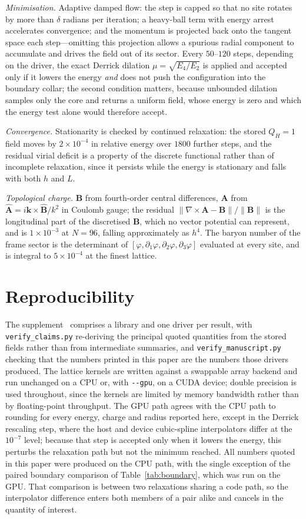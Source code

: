 \documentclass[aps,prd,preprint,nofootinbib,longbibliography]{revtex4-2}
\newcommand{\Av}{\bm{A}}
\newcommand{\Bv}{\bm{B}}
\newcommand{\Qh}{Q_H}
\begin{document}
\emph{Minimisation.} Adaptive damped flow: the step is capped so that no site
rotates by more than $\delta$ radians per iteration; a heavy-ball term with
energy arrest accelerates convergence; and the momentum is projected back onto
the tangent space each step---omitting this projection allows a spurious radial
component to accumulate and drives the field out of its sector. Every $50$--$120$
steps, depending on the driver, the exact Derrick dilation $\mu=\sqrt{E_4/E_2}$ is applied and accepted
only if it lowers the energy \emph{and} does not push the configuration into the
boundary collar; the second condition matters, because unbounded dilation samples
only the core and returns a uniform field, whose energy is zero and which the
energy test alone would therefore accept.

\emph{Convergence.} Stationarity is checked by continued relaxation: the stored
$\Qh=1$ field moves by $2\times10^{-4}$ in relative energy over $1800$ further
steps, and the residual virial deficit is a property of the discrete functional
rather than of incomplete relaxation, since it persists while the energy is
stationary and falls with both $h$ and $L$.

\emph{Topological charge.} $\Bv$ from fourth-order central differences, $\Av$
from $\hat{\Av}=i\bm{k}\times\hat{\Bv}/k^2$ in Coulomb gauge; the residual
$\|\nabla\times\Av-\Bv\|/\|\Bv\|$ is the longitudinal part of the discretised
$\Bv$, which no vector potential can represent, and is $1\times10^{-3}$ at $N=96$,
falling approximately as $h^4$. The baryon number
of the frame sector is the determinant of
$[\varphi,\partial_1\varphi,\partial_2\varphi,\partial_3\varphi]$ evaluated at
every site, and is integral to $5\times10^{-4}$ at the finest lattice.

\section{Reproducibility}

The supplement~\cite{repo} comprises a library and one driver per result, with
\texttt{verify\_claims.py} re-deriving the principal quoted quantities from the
stored fields rather than from intermediate summaries, and
\texttt{verify\_manuscript.py} checking that the numbers printed in this paper
are the numbers those drivers produced.
The lattice kernels are written against a swappable array backend and run unchanged
on a CPU or, with \texttt{-{}-gpu}, on a CUDA device; double precision is used
throughout, since the kernels are limited by memory bandwidth rather than by
floating-point throughput. The GPU path agrees with the CPU path to rounding for
every energy, charge and radius reported here, except in the Derrick rescaling
step, where the host and device cubic-spline interpolators differ at the
$10^{-7}$ level; because that step is accepted only when it lowers the energy,
this perturbs the relaxation path but not the minimum reached. All numbers quoted
in this paper were produced on the CPU path, with the single exception of the
paired boundary comparison of Table~\ref{tab:boundary}, which was run on the GPU.
That comparison is between two relaxations sharing a code path, so the
interpolator difference enters both members of a pair alike and cancels in the
quantity of interest.



\end{document}
